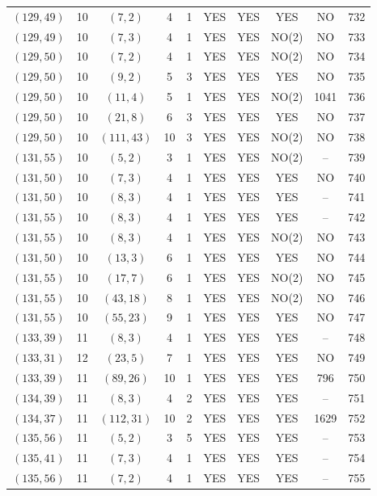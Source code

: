 \begin{longtable}{|c|c|c|c|c|c|c|c|c|c|}
$(129, 49)$ & 10 & $(7, 2)$ & 4 & 1 & YES & YES & YES & NO & 732\\
$(129, 49)$ & 10 & $(7, 3)$ & 4 & 1 & YES & YES & NO(2) & NO & 733\\
$(129, 50)$ & 10 & $(7, 2)$ & 4 & 1 & YES & YES & NO(2) & NO & 734\\
$(129, 50)$ & 10 & $(9, 2)$ & 5 & 3 & YES & YES & YES & NO & 735\\
$(129, 50)$ & 10 & $(11, 4)$ & 5 & 1 & YES & YES & NO(2) & 1041 & 736\\
$(129, 50)$ & 10 & $(21, 8)$ & 6 & 3 & YES & YES & YES & NO & 737\\
$(129, 50)$ & 10 & $(111, 43)$ & 10 & 3 & YES & YES & NO(2) & NO & 738\\
$(131, 55)$ & 10 & $(5, 2)$ & 3 & 1 & YES & YES & NO(2) & -- & 739\\
$(131, 50)$ & 10 & $(7, 3)$ & 4 & 1 & YES & YES & YES & NO & 740\\
$(131, 50)$ & 10 & $(8, 3)$ & 4 & 1 & YES & YES & YES & -- & 741\\
$(131, 55)$ & 10 & $(8, 3)$ & 4 & 1 & YES & YES & YES & -- & 742\\
$(131, 55)$ & 10 & $(8, 3)$ & 4 & 1 & YES & YES & NO(2) & NO & 743\\
$(131, 50)$ & 10 & $(13, 3)$ & 6 & 1 & YES & YES & YES & NO & 744\\
$(131, 55)$ & 10 & $(17, 7)$ & 6 & 1 & YES & YES & NO(2) & NO & 745\\
$(131, 55)$ & 10 & $(43, 18)$ & 8 & 1 & YES & YES & NO(2) & NO & 746\\
$(131, 55)$ & 10 & $(55, 23)$ & 9 & 1 & YES & YES & YES & NO & 747\\
$(133, 39)$ & 11 & $(8, 3)$ & 4 & 1 & YES & YES & YES & -- & 748\\
$(133, 31)$ & 12 & $(23, 5)$ & 7 & 1 & YES & YES & YES & NO & 749\\
$(133, 39)$ & 11 & $(89, 26)$ & 10 & 1 & YES & YES & YES & 796 & 750\\
$(134, 39)$ & 11 & $(8, 3)$ & 4 & 2 & YES & YES & YES & -- & 751\\
$(134, 37)$ & 11 & $(112, 31)$ & 10 & 2 & YES & YES & YES & 1629 & 752\\
$(135, 56)$ & 11 & $(5, 2)$ & 3 & 5 & YES & YES & YES & -- & 753\\
$(135, 41)$ & 11 & $(7, 3)$ & 4 & 1 & YES & YES & YES & -- & 754\\
$(135, 56)$ & 11 & $(7, 2)$ & 4 & 1 & YES & YES & YES & -- & 755\\

\end{longtable}

